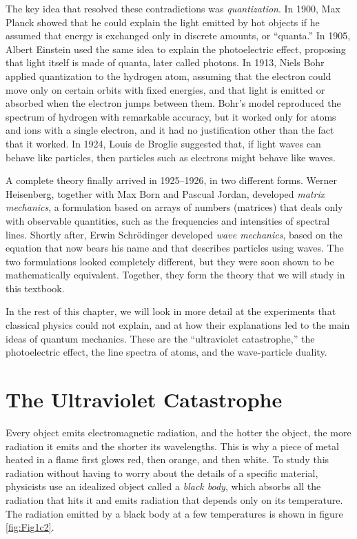 \documentclass[
  english,
  9pt,
]{extbook}
\theoremstyle{definition}
\theoremstyle{definition}
\theoremstyle{definition}
\theoremstyle{definition}
\theoremstyle{remark}
\begin{document}
The key idea that resolved these contradictions was \emph{quantization}. In 1900, Max Planck showed that he could explain the light emitted by hot objects if he assumed that energy is exchanged only in discrete amounts, or ``quanta.'' In 1905, Albert Einstein used the same idea to explain the photoelectric effect, proposing that light itself is made of quanta, later called photons. In 1913, Niels Bohr applied quantization to the hydrogen atom, assuming that the electron could move only on certain orbits with fixed energies, and that light is emitted or absorbed when the electron jumps between them. Bohr's model reproduced the spectrum of hydrogen with remarkable accuracy, but it worked only for atoms and ions with a single electron, and it had no justification other than the fact that it worked. In 1924, Louis de Broglie suggested that, if light waves can behave like particles, then particles such as electrons might behave like waves.

A complete theory finally arrived in 1925--1926, in two different forms. Werner Heisenberg, together with Max Born and Pascual Jordan, developed \emph{matrix mechanics}, a formulation based on arrays of numbers (matrices) that deals only with observable quantities, such as the frequencies and intensities of spectral lines. Shortly after, Erwin Schrödinger developed \emph{wave mechanics}, based on the equation that now bears his name and that describes particles using waves. The two formulations looked completely different, but they were soon shown to be mathematically equivalent. Together, they form the theory that we will study in this textbook.

In the rest of this chapter, we will look in more detail at the experiments that classical physics could not explain, and at how their explanations led to the main ideas of quantum mechanics. These are the ``ultraviolet catastrophe,'' the photoelectric effect, the line spectra of atoms, and the wave-particle duality.

\section{The Ultraviolet Catastrophe}\label{the-ultraviolet-catastrophe}

Every object emits electromagnetic radiation, and the hotter the object, the more radiation it emits and the shorter its wavelengths. This is why a piece of metal heated in a flame first glows red, then orange, and then white. To study this radiation without having to worry about the details of a specific material, physicists use an idealized object called a \emph{black body}, which absorbs all the radiation that hits it and emits radiation that depends only on its temperature. The radiation emitted by a black body at a few temperatures is shown in figure \ref{fig:Fig1c2}.
\end{document}
